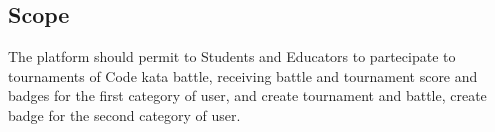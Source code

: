 \subsection{Scope}
The platform should permit to Students and Educators to partecipate to tournaments of Code kata battle, receiving battle and tournament score and badges for the first category of user, and create tournament and battle, create badge for the second category of user.
